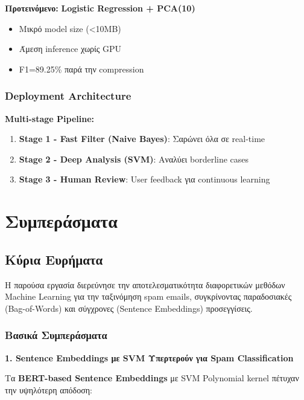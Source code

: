 \documentclass[12pt,a4paper,twoside]{book}
\begin{document}
\textbf{Προτεινόμενο:} \textbf{Logistic Regression + PCA(10)}
\begin{itemize}
    \item \checkmark Μικρό model size (<10MB)
    \item \checkmark Άμεση inference χωρίς GPU
    \item \checkmark F1=89.25\% παρά την compression
\end{itemize}

\subsection{Deployment Architecture}

\textbf{Multi-stage Pipeline:}

\begin{enumerate}
    \item \textbf{Stage 1 - Fast Filter (Naive Bayes)}: Σαρώνει όλα σε real-time
    \item \textbf{Stage 2 - Deep Analysis (SVM)}: Αναλύει borderline cases
    \item \textbf{Stage 3 - Human Review}: User feedback για continuous learning
\end{enumerate}

\chapter{Συμπεράσματα}

\section{Κύρια Ευρήματα}

Η παρούσα εργασία διερεύνησε την αποτελεσματικότητα διαφορετικών μεθόδων Machine Learning για την ταξινόμηση spam emails, συγκρίνοντας παραδοσιακές (Bag-of-Words) και σύγχρονες (Sentence Embeddings) προσεγγίσεις.

\subsection{Βασικά Συμπεράσματα}

\textbf{1. Sentence Embeddings με SVM Υπερτερούν για Spam Classification}

Τα \textbf{BERT-based Sentence Embeddings} με SVM Polynomial kernel πέτυχαν την υψηλότερη απόδοση:
\end{document}

